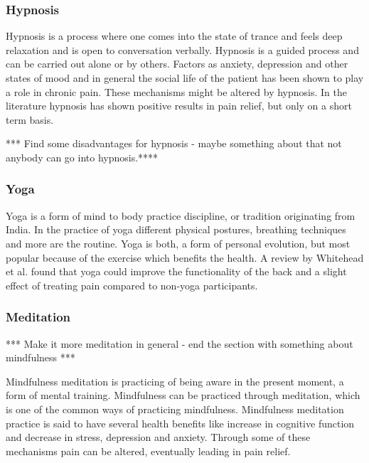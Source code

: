 \subsubsection{Hypnosis}
Hypnosis is a process where one comes into the state of trance and feels deep relaxation and is open to conversation verbally. Hypnosis is a guided process and can be carried out alone or by others. \cite{Gerald2013} Factors as anxiety, depression and other states of mood and in general the social life of the patient has been shown to play a role in chronic pain. These mechanisms might be altered by hypnosis.
In the literature hypnosis has shown positive results in pain relief, but only on a short term basis. \cite{Dhanani2011}

*** Find some disadvantages for hypnosis - maybe something about that not anybody can go into hypnosis.****

\subsubsection{Yoga}
Yoga is a form of mind to body practice discipline, or tradition originating from India. In the practice of yoga different physical postures, breathing techniques and more are the routine. 
Yoga is both, a form of personal evolution, but most popular because of the exercise which benefits the health.
A review by Whitehead et al. \cite{Whitehead2017} found that yoga could improve the functionality of the back and a slight effect of treating pain compared to non-yoga participants. 

\subsubsection{Meditation}
*** Make it more meditation in general - end the section with something about mindfulness *** 

Mindfulness meditation is practicing of being aware in the present moment, a form of mental training. Mindfulness can be practiced through meditation, which is one of the common ways of practicing mindfulness. Mindfulness meditation practice is said to have several health benefits like increase in cognitive function and decrease in stress, depression and anxiety. Through some of these mechanisms pain can be altered, eventually leading in pain relief. \cite{Zeidan2016} 

